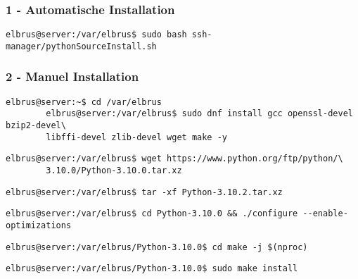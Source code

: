 \documentclass{article}
\begin{document}
	\subsubsection{1 - Automatische Installation}

	\lstset{style=commands}
	\begin{lstlisting}[caption={Ausführen des 'pythonSourceInstall.sh' Scripts.}]
		elbrus@server:/var/elbrus$ sudo bash ssh-manager/pythonSourceInstall.sh
	\end{lstlisting}
	
	\subsubsection{2 - Manuel Installation}
	
	\lstset{style=commands}
	\begin{lstlisting}[caption={Installieren von benötigten Packeten und Abhängigkeiten.}]
		elbrus@server:~$ cd /var/elbrus
		elbrus@server:/var/elbrus$ sudo dnf install gcc openssl-devel bzip2-devel\
		libffi-devel zlib-devel wget make -y
	\end{lstlisting}
	
	\lstset{style=commands}
	\begin{lstlisting}[caption={Herunterladen der Source Datei.}]
		elbrus@server:/var/elbrus$ wget https://www.python.org/ftp/python/\
		3.10.0/Python-3.10.0.tar.xz
	\end{lstlisting}
	
	\lstset{style=commands}
	\begin{lstlisting}[caption={Extrahieren der installierten Datei.}]
		elbrus@server:/var/elbrus$ tar -xf Python-3.10.2.tar.xz
	\end{lstlisting}
	
	\lstset{style=commands}
	\begin{lstlisting}[caption={Wechseln zu source Verzeichniss. Und ausführen des Konfigurations Scripts.}]
		elbrus@server:/var/elbrus$ cd Python-3.10.0 && ./configure --enable-optimizations
	\end{lstlisting}

	\lstset{style=commands}
	\begin{lstlisting}[caption={Starten des build Prozesses.}]
		elbrus@server:/var/elbrus/Python-3.10.0$ cd make -j $(nproc)
	\end{lstlisting}
	
	\lstset{style=commands}
	\begin{lstlisting}[caption={Installieren von Python.}]
		elbrus@server:/var/elbrus/Python-3.10.0$ sudo make install
	\end{lstlisting}
\end{document}
